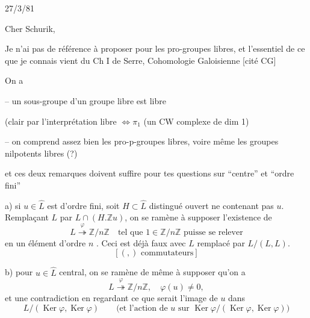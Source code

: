 
\begin{flushright}
27/3/81
\end{flushright}

Cher Schurik,

Je n'ai pas de référence à proposer pour les pro-groupes libres, et l'essentiel de ce que je connais vient du Ch I de Serre, Cohomologie Galoisienne [cité CG]

On a

-- un sous-groupe d'un groupe libre est libre

\quad (clair par l'interprétation libre $\Longleftrightarrow\pi_1$ (un CW complexe de dim 1)

-- on comprend assez bien les pro-p-groupes libres, voire même les groupes nilpotents libres (?)


et ces deux remarques doivent suffire pour tes questions sur ``centre'' et ``ordre fini''

a) si $u\in\hat L$ est d'ordre fini, soit $H\subset\hat L$ distingué ouvert ne contenant pas $u$\unsure{$\overset{\circ}{!}$}.
Remplaçant $L$ par $L\cap(H.\mathbb Zu)$, on se ramène à supposer  l'existence de
\[
L\overset{\varphi}{\twoheadrightarrow}\mathbb Z/n\mathbb Z
\quad\text{tel que }1\in\mathbb Z/n\mathbb Z\text{ puisse se relever}
\]
en un élément d'ordre $n$ . Ceci est déjà faux avec $L$ remplacé par $L/(L,L)$.
\[
[(,)\text{ commutateurs}]
\]

b) pour $u\in\hat L$ central, on se ramène de même à supposer qu'on a
\[
L\overset{\varphi}{\twoheadrightarrow}\mathbb Z/n\mathbb Z,\quad
\varphi(u)\ne0,
\]
et une contradiction en regardant ce que serait l'image de  $u$ dans
\[
L/(\operatorname{Ker}\varphi,\operatorname{Ker}\varphi)
\qquad
\text{(et l'action de }u\text{ sur }
\operatorname{Ker}\varphi/(\operatorname{Ker}\varphi,\operatorname{Ker}\varphi))
\]

